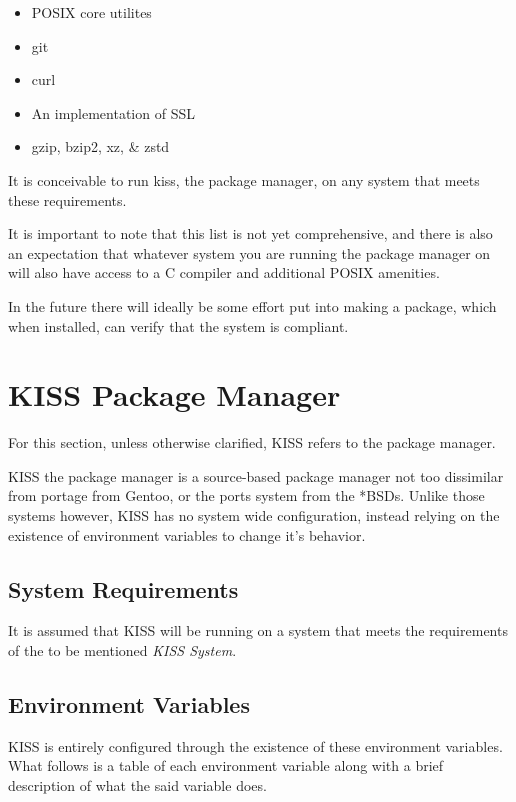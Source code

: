 \documentclass{article}
\begin{document}
\begin{itemize}
\item POSIX core utilites
\item git
\item curl
\item An implementation of SSL
\item gzip, bzip2, xz, \& zstd
\end{itemize}

It is conceivable to run kiss, the package manager, on any system
that meets these requirements.

It is important to note that this list is not yet comprehensive, and
there is also an expectation that whatever system you are running
the package manager on will also have access to a C compiler and
additional POSIX amenities.

In the future there will ideally be some effort put into making
a package, which when installed, can verify that the system is
compliant.

\section{KISS Package Manager}

For this section, unless otherwise clarified, KISS refers to the
package manager.

KISS the package manager is a source-based package manager
not too dissimilar from portage from Gentoo, or the ports
system from the *BSDs. Unlike those systems however,
KISS has no system wide configuration, instead relying
on the existence of environment variables to change it's behavior.

\subsection{System Requirements}

It is assumed that KISS will be running on a system that meets
the requirements of the to be mentioned \textit{KISS System}.

\subsection{Environment Variables}

KISS is entirely configured through the existence of these environment
variables. What follows is a table of each environment variable along
with a brief description of what the said variable does.
\end{document}

